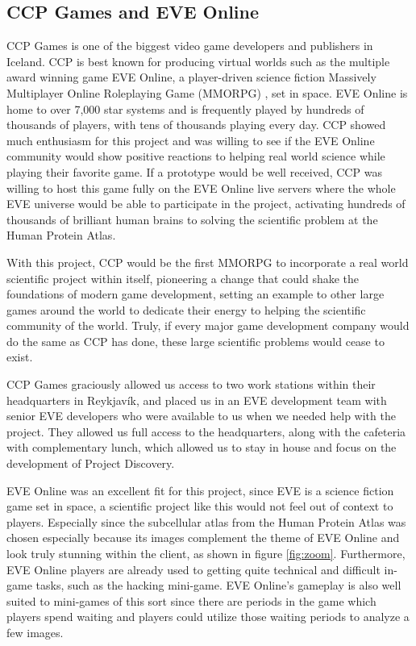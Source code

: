 \subsection{CCP Games and EVE Online}

	CCP Games \cite{CCP} is one of the biggest video game developers and publishers in Iceland. CCP is best known for producing virtual worlds such as the multiple award winning game EVE Online, a player-driven science fiction Massively Multiplayer Online Roleplaying Game (MMORPG) \cite{mmorpg}, set in space. EVE Online is home to over 7,000 star systems and is frequently played by hundreds of thousands of players, with tens of thousands playing every day. CCP showed much enthusiasm for this project and was willing to see if the EVE Online community would show positive reactions to helping real world science while playing their favorite game. If a prototype would be well received, CCP was willing to host this game fully on the EVE Online live servers where the whole EVE universe would be able to participate in the project, activating hundreds of thousands of brilliant human brains to solving the scientific problem at the Human Protein Atlas.

	With this project, CCP would be the first MMORPG to incorporate a real world scientific project within itself, pioneering a change that could shake the foundations of modern game development, setting an example to other large games around the world to dedicate their energy to helping the scientific community of the world. Truly, if every major game development company would do the same as CCP has done, these large scientific problems would cease to exist.

	CCP Games graciously allowed us access to two work stations within their headquarters in Reykjavík, and placed us in an EVE development team with senior EVE developers who were available to us when we needed help with the project. They allowed us full access to the headquarters, along with the cafeteria with complementary lunch, which allowed us to stay in house and focus on the development of Project Discovery.

	EVE Online was an excellent fit for this project, since EVE is a science fiction game set in space, a scientific project like this would not feel out of context to players. Especially since the subcellular atlas from the Human Protein Atlas was chosen especially because its images complement the theme of EVE Online and look truly stunning within the client, as shown in figure \ref{fig:zoom}. Furthermore, EVE Online players are already used to getting quite technical and difficult in-game tasks, such as the hacking mini-game. EVE Online's gameplay is also well suited to mini-games of this sort since there are periods in the game which players spend waiting and players could utilize those waiting periods to analyze a few images.


